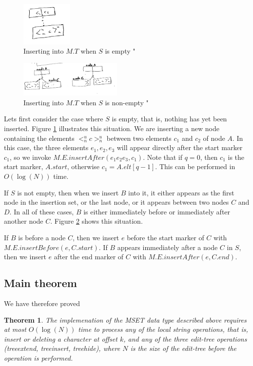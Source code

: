 \documentclass{amsart}
\newtheorem{theorem}{Theorem}[section]
\begin{document}
\begin{figure}[h]
\centering
\includegraphics[width=1.0in]{insertTree001.jpg}
\caption{Inserting into $M.T$ when $S$ is empty \label{fig:emptyS}"}
\end{figure}

\begin{figure}[h]
\centering
\includegraphics[width=2.0in]{insertTree002.jpg}
\caption{Inserting into $M.T$ when $S$ is non-empty \label{fig:nonemptyS}"}
\end{figure}

Lets first consider the case where $S$ is empty, that is, nothing has yet been inserted. 
 Figure \ref{fig:emptyS} illustrates this situation. We are inserting a new node containing the elements $<^u_n c >^u_n$ between two elements $c_1$ and $c_2$ of node $A$.
In this case, the three elements $e_1,e_2,e_3$ will appear directly after the start marker $c_1$,
so we invoke $M.E.insertAfter(e_1e_2e_3,c_1)$.  
Note that if $q=0$, then $c_1$ is the start marker, $A.start$, otherwise $c_1=A.elt[q-1]$.
This can be performed in $O(\log(N))$ time.

If $S$ is not empty, then when we insert $B$ into it, it either appears as the first node in the insertion set, or the last node, or it appears between two nodes $C$ and $D$. In all of these cases, $B$ is either immediately before or immediately after another node $C$. Figure \ref{fig:nonemptyS} shows this situation.

If $B$ is before a node $C$, then we insert $e$ before the start marker of $C$ with
$M.E.insertBefore(e,C.start)$. If $B$ appears immediately after a node $C$ in $S$,
then we insert $e$ after the end marker of $C$ with
$M.E.insertAfter(e,C.end)$.


\subsection{Main theorem}
We have therefore proved 

\begin{theorem}
The implemenation of the MSET data type described above requires at most
$O(\log(N))$ time to process any of the local string operations, that is,
 insert or deleting a character at offset $k$, and
any of the three edit-tree operations (treeextend, treeinsert, treehide), where $N$ is the size of the edit-tree before the operation is performed.
\end{theorem}
\end{document}

